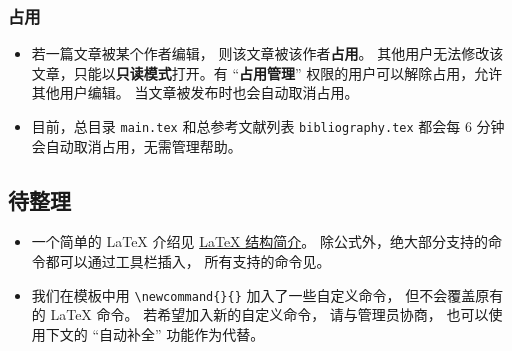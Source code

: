 \subsubsection{占用}
\begin{itemize}
\item 若一篇文章被某个作者编辑， 则该文章被该作者\textbf{占用}。 其他用户无法修改该文章，只能以\textbf{只读模式}打开。有 “\textbf{占用管理}” 权限的用户可以解除占用，允许其他用户编辑。 当文章被发布时也会自动取消占用。
\item 目前，总目录 \verb`main.tex` 和总参考文献列表 \verb`bibliography.tex` 都会每 6 分钟会自动取消占用，无需管理帮助。
\end{itemize}


\subsection{待整理}

\begin{itemize}
\item 一个简单的 LaTeX 介绍见 \href{https://wuli.wiki/online/latxIn.html}{LaTeX 结构简介}。 除公式外，绝大部分支持的命令都可以通过工具栏插入， 所有支持的命令见。
\item 我们在模板中用 \verb|\newcommand{}{}| 加入了一些自定义命令， 但不会覆盖原有的 LaTeX 命令。 若希望加入新的自定义命令， 请与管理员协商， 也可以使用下文的 “自动补全” 功能作为代替。
\end{itemize}

